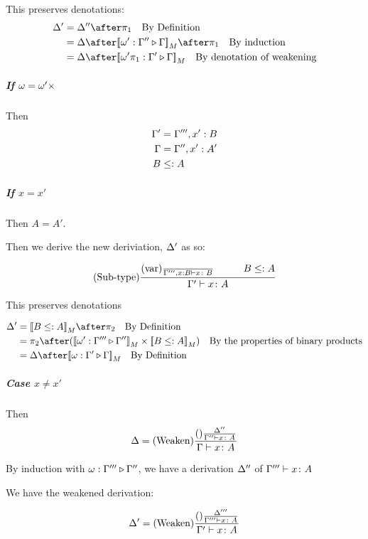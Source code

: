 \documentclass{report}
\begin{document}
    This preserves denotations:
    \begin{align}
        \D' & = \D''\after\p\qt{By Definition} \\
        & = \D\after\deno{\wrel{\w'}{\G''}{\G}}\after\p\qt{By induction}\\
        & = \D\after\deno{\wrel{\w'\p}{\G'}{\G}}\qt{By denotation of weakening}
    \end{align}

    \subparagraph{If $\omega = \omega'\times$} 
    Then 
    \begin{align}
        \Gamma' & = \Gamma''', x': B\\
        \Gamma &= \Gamma'', x': A'\\
        B & \leq: A
    \end{align}

    \subparagraph{If $x = x'$}

    Then $A = A'$.

    Then we derive the new deriviation, $\Delta'$ as so:

    \begin{equation}
        \treerule{Sub-type}{
            \treerule{var}{}{\typerelation{\G''', x: B}{x}{B}}
            \s\s
            B \subtype A
        }{
            \typerelation{\G'}{x}{A}
        }
    \end{equation}

    This preserves denotations

    \begin{align}
        \D' & = \deno{B\subtype A}\after\pp\qt{By Definition} \\
         & = \pp\after (\deno{\wrel{\w'}{\G'''}{\G''}}\times \deno{B\subtype A}) \qt{By the properties of binary products}\\
         & = \D\after\deno{\wrel{\w}{\G'}{\G}}\qt{By Definition}
    \end{align}

    \subparagraph{Case $x \neq x'$}
    Then 
    \begin{equation}
        \Delta = (\text{Weaken}) \frac{(\text{}) \frac{\Delta''}{\Gamma'' \vdash x \colon A}}{\Gamma \vdash x \colon A}
    \end{equation}

    By induction with $\omega : \Gamma''' \triangleright \Gamma''$,
     we have a derivation $\Delta''$ of $\Gamma''' \vdash x \colon A$

    We have the weakened derivation:

    \begin{equation}
        \Delta' = (\text{Weaken}) \frac{(\text{}) \frac{\Delta'''}{\Gamma''' \vdash x \colon A}}{\Gamma' \vdash x \colon A}
    \end{equation}
\end{document}
